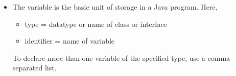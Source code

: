 
\begin{flushleft}
	\begin{itemize}
		\item The variable is the basic unit of storage in a Java program.
		\bigskip
		Here, 
		\begin{itemize}
			\item type = datatype or name of class or interface
			\item identifier = name of variable
		\end{itemize}
		
		\bigskip
		To declare more than one variable of the specified type, use a comma-separated list.
		\bigskip
			
	\end{itemize}	
		
\end{flushleft}
\newpage
